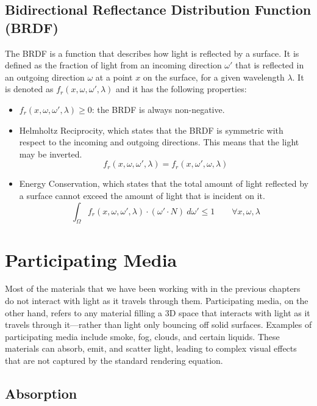 \subsection{Bidirectional Reflectance Distribution Function (BRDF)}
The BRDF is a function that describes how light is reflected by a surface. It is defined as the fraction of light from an incoming direction $\omega'$ that is reflected in an outgoing direction $\omega$ at a point $x$ on the surface, for a given wavelength $\lambda$. It is denoted as $f_r(x, \omega, \omega', \lambda)$ and it has the following properties:
\begin{itemize}
    \item $f_r(x, \omega, \omega', \lambda) \geq 0$: the BRDF is always non-negative.
    \item Helmholtz Reciprocity, which states that the BRDF is symmetric with respect to the incoming and outgoing directions. This means that the light may be inverted.
    \begin{equation*}
f_r(x, \omega, \omega', \lambda) = f_r(x, \omega', \omega, \lambda)
    \end{equation*}
    \item Energy Conservation, which states that the total amount of light reflected by a surface cannot exceed the amount of light that is incident on it.
    \begin{equation*}
\int_{\Omega} f_r(x, \omega, \omega', \lambda) \cdot (\omega' \cdot N)\ d\omega' \leq 1\qquad \forall x, \omega, \lambda
    \end{equation*}
\end{itemize}

\section{Participating Media}

Most of the materials that we have been working with in the previous chapters do not interact with light as it travels through them. Participating media, on the other hand, refers to any material filling a 3D space that interacts with light as it travels through it—rather than light only bouncing off solid surfaces. Examples of participating media include smoke, fog, clouds, and certain liquids. These materials can absorb, emit, and scatter light, leading to complex visual effects that are not captured by the standard rendering equation.

\subsection{Absorption}


